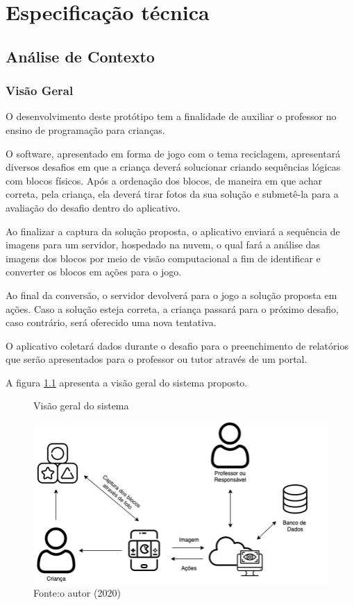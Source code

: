 \chapter{Especificação técnica} \label{cap:especificacao_tecnica}

\section{Análise de Contexto}

    \subsection{Visão Geral}
    O desenvolvimento deste protótipo tem a finalidade de auxiliar o professor no ensino de programação para crianças.
    
    O software, apresentado em forma de jogo com o tema reciclagem, apresentará diversos desafios em que a criança deverá solucionar criando sequências lógicas com blocos físicos. Após a ordenação dos blocos, de maneira em que achar correta, pela criança, ela deverá tirar fotos da sua solução e submetê-la para a avaliação do desafio dentro do aplicativo.
    
    Ao finalizar a captura da solução proposta, o aplicativo enviará a sequência de imagens para um servidor, hospedado na nuvem, o qual fará a análise das imagens dos blocos
    por meio de visão computacional a fim de identificar e converter os blocos em ações para o jogo.
    
    Ao final da conversão, o servidor devolverá para o jogo a solução proposta em ações.
    Caso a solução esteja correta, a criança passará para o próximo desafio, caso contrário, será oferecido uma nova tentativa.
    
    O aplicativo coletará dados durante o desafio para o preenchimento de relatórios que serão apresentados para o professor ou tutor através de um portal.
    
    A figura \ref{figura:diagrama_blocos} apresenta a visão geral do sistema proposto.
    
    \begin{figure}[h!]
        \centering
        \caption{Visão geral do sistema}
        \includegraphics[width=12cm]{images/cap3/diagrama_blocos.png}
        \caption*{Fonte:o autor (2020)}
        \label{figura:diagrama_blocos}
    \end{figure}
    
